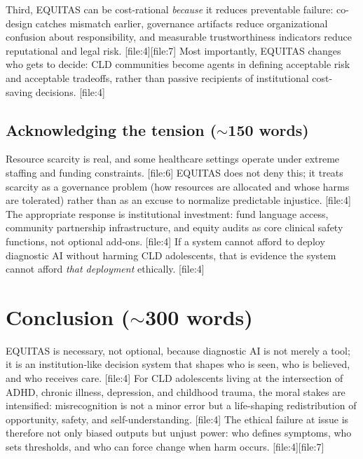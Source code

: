 \documentclass[12pt]{article}
\begin{document}
Third, EQUITAS can be cost-rational \textit{because} it reduces preventable failure: co-design catches mismatch earlier, governance artifacts reduce organizational confusion about responsibility, and measurable trustworthiness indicators reduce reputational and legal risk. [file:4][file:7]
Most importantly, EQUITAS changes who gets to decide: CLD communities become agents in defining acceptable risk and acceptable tradeoffs, rather than passive recipients of institutional cost-saving decisions. [file:4]

\subsection*{Acknowledging the tension (\texorpdfstring{$\sim$}{\textasciitilde}150 words)}
Resource scarcity is real, and some healthcare settings operate under extreme staffing and funding constraints. [file:6]
EQUITAS does not deny this; it treats scarcity as a governance problem (how resources are allocated and whose harms are tolerated) rather than as an excuse to normalize predictable injustice. [file:4]
The appropriate response is institutional investment: fund language access, community partnership infrastructure, and equity audits as core clinical safety functions, not optional add-ons. [file:4]
If a system cannot afford to deploy diagnostic AI without harming CLD adolescents, that is evidence the system cannot afford \textit{that deployment} ethically. [file:4]

\section{Conclusion (\texorpdfstring{$\sim$}{\textasciitilde}300 words)}

EQUITAS is necessary, not optional, because diagnostic AI is not merely a tool; it is an institution-like decision system that shapes who is seen, who is believed, and who receives care. [file:4]
For CLD adolescents living at the intersection of ADHD, chronic illness, depression, and childhood trauma, the moral stakes are intensified: misrecognition is not a minor error but a life-shaping redistribution of opportunity, safety, and self-understanding. [file:4]
The ethical failure at issue is therefore not only biased outputs but unjust power: who defines symptoms, who sets thresholds, and who can force change when harm occurs. [file:4][file:7]
\end{document}
